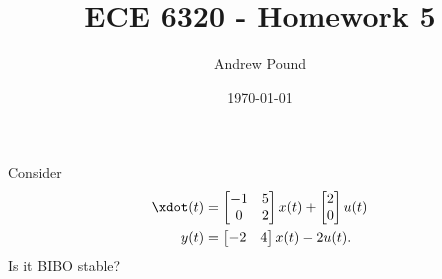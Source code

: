 \documentclass[10pt]{article}
\title{ECE 6320 - Homework 5
}
\author{Andrew Pound}
\date{\today}
\begin{document}
\maketitle




\section{}
Consider
\begin{equation*}
  \begin{split}
    \xdot(t) &=
    \begin{bmatrix}
      -1 & 5 \\ 0 & 2
    \end{bmatrix}x(t) +
    \begin{bmatrix}
      2 \\ 0
    \end{bmatrix}u(t)\\
    y(t) &= 
    \begin{bmatrix}
      -2 & 4
    \end{bmatrix}x(t) - 2u(t).
  \end{split}
\end{equation*}
Is it BIBO stable?
\end{document}
